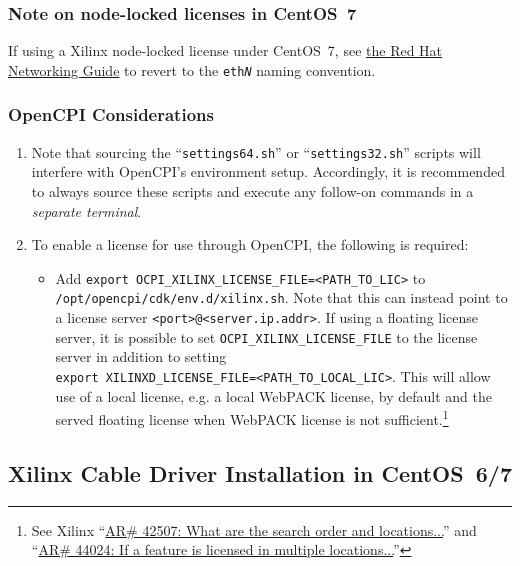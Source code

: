 \subsubsection{Note on node-locked licenses in CentOS~7}
If using a Xilinx node-locked license under CentOS~7, see \href{https://access.redhat.com/documentation/en-US/Red_Hat_Enterprise_Linux/7/html/Networking_Guide/sec-Disabling_Consistent_Network_Device_Naming.html}{the Red Hat Networking Guide} to revert to the
\texttt{eth\textit{N}} naming convention.

\subsubsection{OpenCPI Considerations}
\begin{enumerate}
\item Note that sourcing the ``\verb+settings64.sh+'' or ``\verb+settings32.sh+'' scripts will interfere with OpenCPI's environment setup. Accordingly, it is recommended to always source these scripts and execute any follow-on commands in a \textit{separate terminal}.
\item To enable a license for use through OpenCPI, the following is required:

	\begin{itemize}
		\item Add \verb+export OCPI_XILINX_LICENSE_FILE=<PATH_TO_LIC>+ to \verb+/opt/opencpi/cdk/env.d/xilinx.sh+. Note that this can instead point to a license server \verb+<port>@<server.ip.addr>+. If using a floating license server, it is possible to set \verb+OCPI_XILINX_LICENSE_FILE+ to the license server in addition to setting \\\verb+export XILINXD_LICENSE_FILE=<PATH_TO_LOCAL_LIC>+. This will allow use of a local license, e.g. a local WebPACK license, by default and the served floating license when WebPACK license is not sufficient.\footnote{See Xilinx ``\href{https://www.xilinx.com/support/answers/42507.html}{AR\# 42507: What are the search order and locations...}'' and ``\href{https://www.xilinx.com/support/answers/44024.html}{AR\# 44024: If a feature is licensed in multiple locations...}''}
	\end{itemize}
\end{enumerate}

\subsection{Xilinx Cable Driver Installation in CentOS~6/7}
\label{sec:cable}
